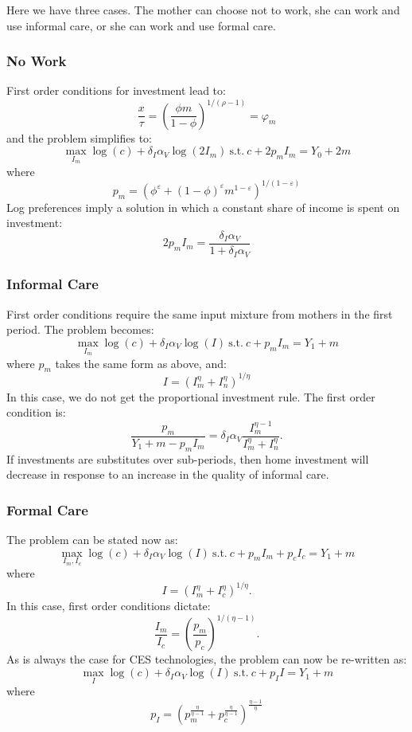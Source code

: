\documentclass[12pt]{article}
\numberwithin{equation}{section}
\numberwithin{figure}{section}
\numberwithin{table}{section}
\begin{document}
Here we have three cases. The mother can choose not to work, she can work and use informal care, or she can work and use formal care.

\subsubsection{No Work}
First order conditions for investment lead to:
\begin{equation}
\frac{x}{\tau} = \left(\frac{\phi m}{1-\phi}\right)^{1/(\rho-1)} = \varphi_m
\end{equation}
and the problem simplifies to:
\[\max_{I_m} \log(c) + \delta_{I}\alpha_{V}\log(2I_m)\ \text{s.t.}\ c + 2p_mI_m = Y_0 + 2m \]
where
\[p_m = \left(\phi^\varepsilon + (1-\phi)^\varepsilon m^{1-\varepsilon}\right)^{1/(1-\varepsilon)} \]
Log preferences imply a solution in which a constant share of income is spent on investment:
\[ 2p_m I_m = \frac{\delta_I\alpha_V}{1+\delta_{I}\alpha_V} \]

\subsubsection{Informal Care}
First order conditions require the same input mixture from mothers in the first period. The problem becomes:
\[\max_{I_m} \log(c) + \delta_{I}\alpha_{V}\log(I)\ \text{s.t.}\ c + p_mI_m = Y_1 + m \]
where $p_m$ takes the same form as above, and:
\[ I = \left(I_m^\eta + I_n^\eta\right)^{1/\eta} \]
In this case, we do not get the proportional investment rule. The first order condition is:
\[\frac{p_m}{Y_1 + m - p_mI_m} = \delta_I\alpha_V\frac{I_m^{\eta-1}}{I_m^\eta + I_n^\eta}.\]
If investments are substitutes over sub-periods, then home investment will decrease in response to an increase in the quality of informal care.


\subsubsection{Formal Care}
The problem can be stated now as:
\[\max_{I_m,I_c} \log(c) + \delta_{I}\alpha_{V}\log(I)\ \text{s.t.}\ c + p_mI_m + p_cI_c = Y_1 + m \]
where
\[ I = \left(I_m^\eta + I_c^\eta\right)^{1/\eta}.\]
In this case, first order conditions dictate:
\[ \frac{I_m}{I_c} = \left(\frac{p_m}{p_c}\right)^{1/(\eta-1)} .\]
As is always the case for CES technologies, the problem can now be re-written as:
\[\max_{I} \log(c) + \delta_{I}\alpha_{V}\log(I)\ \text{s.t.}\ c + p_I I = Y_1 + m \]
where
\[ p_I = \left(p_m^\frac{\eta}{\eta-1} + p_c^\frac{\eta}{\eta-1}\right)^\frac{\eta-1}{\eta} \]
\end{document}
